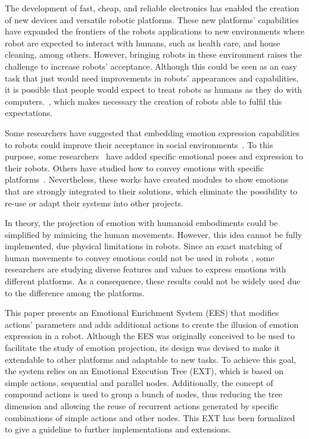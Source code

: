 The development of fast, cheap, and reliable electronics has enabled the creation of new devices and versatile robotic platforms. These new platforms' capabilities have expanded the frontiers of the robots applications to new environments where robot are expected to interact with humans, such as health care, and house cleaning, among others. However, bringing robots in these environment raises the challenge to increase robots' acceptance. Although this could be seen as an easy task that just would need improvements in robots' appearances and capabilities, it is possible that people would expect to treat robots as humans as they do with computers.~\cite{Reeves1996}, which makes necessary the creation of robots able to fulfil this expectations.

Some researchers have suggested that embedding emotion expression capabilities to robots could improve their acceptance in social environments~\cite{Pavia2014}. To this purpose, some researchers~\cite{Breazeal2002, Arras2012} have added specific emotional poses and expression to their robots. Others have studied how to convey emotions with specific platforms~\cite{Li2011, Brown2014}. Nevertheless, these works have created modules to show emotions that are strongly integrated to their solutions, which eliminate the possibility to re-use or adapt their systems into other projects.

In theory, the projection of emotion with humanoid embodiments could be simplified by mimicing the human movements. However, this idea cannot be fully implemented, due physical limitations in robots. Since an exact matching of human movements to convey emotions could not be used in robots \cite{Saerbeck2007,Canamero2010}, some researchers are studying diverse features and values to express emotions with different platforms. As a consequence, these results could not be widely used due to the difference among the platforms.

This paper presents an Emotional Enrichment System (EES) that modifies actions' parameters and adds additional actions to create the illusion of emotion expression in a robot. Although the EES was originally conceived to be used to facilitate the study of emotion projection, its design was devised to make it extendable to other platforms and adaptable to new tasks. To achieve this goal, the system relies on an Emotional Execution Tree (EXT), which is based on simple actions, sequential and parallel nodes. Additionally, the concept of compound actions is used to group a bunch of nodes, thus reducing the tree dimension and allowing the reuse of recurrent actions generated by specific combinations of simple actions and other nodes. This EXT has been formalized to give a guideline to further implementations and extensions.
 
